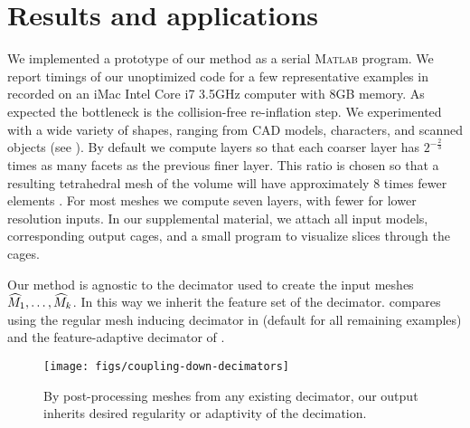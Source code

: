\section{Results and applications}
\label{sec:results}

We implemented a prototype of our method as a serial \textsc{Matlab} program.
%
We report timings of our unoptimized code for a few representative examples in
 recorded on an iMac Intel Core i7 3.5GHz computer with 8GB
memory.
%
As expected the bottleneck is the collision-free re-inflation step.
%
We experimented with a wide variety of shapes, ranging from CAD models,
characters, and scanned objects (see ). By default we compute
layers so that each coarser layer has $2^{-\frac{2}{3}}$ times as many facets as
the previous finer layer. This ratio is chosen so that a resulting tetrahedral
mesh of the volume will have approximately $8$ times fewer elements
. For most
meshes we compute seven layers, with fewer for lower resolution inputs.
%
In our supplemental material, we attach all input models, corresponding output
cages, and a small program to visualize slices through the cages.



Our method is agnostic to the decimator used to create the input meshes
$\widehat{M}_1,\dots,\widehat{M}_k$. In this way we inherit the feature set of the
decimator. 
%
compares using the regular mesh inducing decimator in \cite{cgal} (default for
all remaining examples) and the feature-adaptive decimator of \cite{openmesh}.

\begin{figure}
  \texttt{[image: figs/coupling-down-decimators]}
  \caption{By post-processing meshes from any existing decimator, our output
  inherits desired regularity or adaptivity of the decimation.}
  \label{fig:decimations}
\end{figure}

%
%

